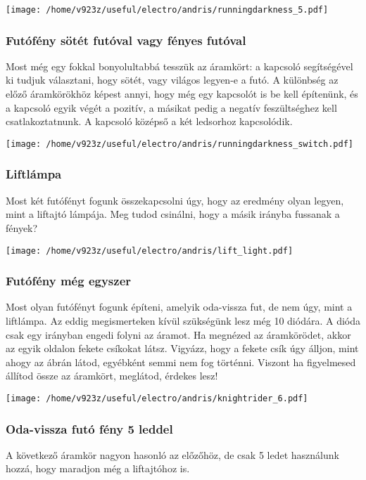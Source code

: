 \documentclass[16pt]{scrreprt}
\begin{document}
\texttt{[image: /home/v923z/useful/electro/andris/runningdarkness\_5.pdf]}

\subsubsection{Futófény sötét futóval vagy fényes futóval}
Most még egy fokkal bonyolultabbá tesszük az áramkört: a kapcsoló segítségével ki tudjuk választani, hogy sötét, vagy
világos legyen-e a futó. A különbség az előző áramkörökhöz képest annyi, hogy még egy kapcsolót is be kell építenünk,
és a kapcsoló egyik végét a pozitív, a másikat pedig a negatív feszültséghez kell csatlakoztatnunk. A kapcsoló középső
a két ledsorhoz kapcsolódik. 

\texttt{[image: /home/v923z/useful/electro/andris/runningdarkness\_switch.pdf]}

\subsubsection{Liftlámpa}
Most két futófényt fogunk összekapcsolni úgy, hogy az eredmény olyan legyen, mint a liftajtó lámpája. Meg tudod
csinálni, hogy a másik irányba fussanak a fények?

\texttt{[image: /home/v923z/useful/electro/andris/lift\_light.pdf]}

\subsubsection{Futófény még egyszer}
Most olyan futófényt fogunk építeni, amelyik oda-vissza fut, de nem úgy, mint a liftlámpa. Az eddig megismerteken kívül
szükségünk lesz még 10 diódára. A dióda csak egy irányban engedi folyni az áramot. Ha megnézed az áramkörödet, akkor az
egyik oldalon fekete csíkokat látsz. Vigyázz, hogy a fekete csík úgy álljon, mint ahogy az ábrán látod, egyébként semmi
nem fog történni. Viszont ha figyelmesed állítod össze az áramkört, meglátod, érdekes lesz!

\texttt{[image: /home/v923z/useful/electro/andris/knightrider\_6.pdf]}

\subsubsection{Oda-vissza futó fény 5 leddel}

A következő áramkör nagyon hasonló az előzőhöz, de csak 5 ledet használunk hozzá, hogy maradjon még a liftajtóhoz is.
\end{document}
